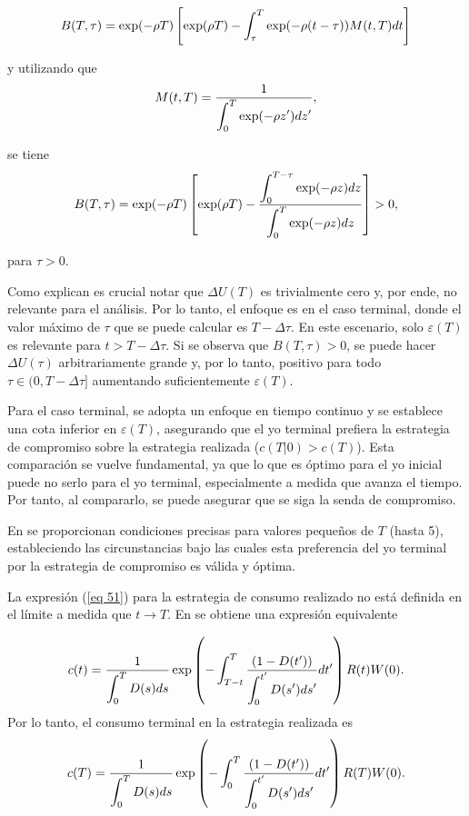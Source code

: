 $$B(T,\tau)= \exp (-\rho T) \left[\exp (\rho T) - \displaystyle \int_{\tau}^T \exp (- \rho (t- \tau)) M(t,T) dt \right]$$

\noindent y utilizando que 
$$ M(t,T)= \dfrac{1}{\displaystyle \int_0^T \exp (- \rho z') dz'},$$

\noindent se tiene
$$B(T,\tau)= \exp (-\rho T) \left[\exp (\rho T) - \dfrac{\displaystyle \int_{0}^{T- \tau} \exp (- \rho z) dz}{\displaystyle \int_{0}^T \exp (- \rho z) dz} \right]>0,$$

\noindent para $\tau>0$.

Como explican \parencite{feigenbaum2021deviation} es crucial notar que $\Delta U(T)$ es trivialmente cero y, por ende, no relevante para el análisis. Por lo tanto, el enfoque es en el caso terminal, donde el valor máximo de $\tau$ que se puede calcular es $T - \Delta \tau$. En este escenario, solo $\varepsilon(T)$ es relevante para $t > T - \Delta \tau$. Si se observa que $B(T, \tau) > 0$, se puede hacer $\Delta U(\tau)$ arbitrariamente grande y, por lo tanto, positivo para todo $\tau \in (0, T - \Delta \tau]$ aumentando suficientemente $\varepsilon(T)$.

Para el caso terminal, se adopta un enfoque en tiempo continuo y se establece una cota inferior en $\varepsilon(T)$, asegurando que el yo terminal prefiera la estrategia de compromiso sobre la estrategia realizada ($c(T|0) > c(T)$). Esta comparación se vuelve fundamental, ya que lo que es óptimo para el yo inicial puede no serlo para el yo terminal, especialmente a medida que avanza el tiempo. Por tanto, al compararlo, se puede asegurar que se siga la senda de compromiso.

En \parencite{Feigenbaum21} se proporcionan condiciones precisas para valores pequeños de $T$ (hasta 5), estableciendo las circunstancias bajo las cuales esta preferencia del yo terminal por la estrategia de compromiso es válida y óptima.

La expresión (\ref{eq 51}) para la estrategia de consumo realizado no está definida en el límite a medida que $t \rightarrow T$. En \parencite{feigenbaum2021deviation} se obtiene una expresión equivalente

$$c(t)= \dfrac{1}{\displaystyle \int_0^T D(s) ds} \exp \left( - \displaystyle \int_{T-t}^T \dfrac{(1-D(t'))}{\displaystyle \int_0^{t'}D(s') ds' }dt'\right) R(t) W(0).$$
%
\noindent Por lo tanto, el consumo terminal en la estrategia realizada es
%
\begin{equation}
\label{eq 65}
    c(T)= \dfrac{1}{\displaystyle \int_0^T D(s) ds} \exp \left( - \displaystyle \int_{0}^T \dfrac{(1-D(t'))}{\displaystyle \int_0^{t'}D(s') ds' }dt'\right) R(T) W(0).
\end{equation}

